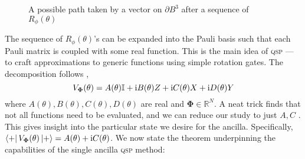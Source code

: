 \documentclass{article}
\begin{document}
\begin{figure}[!ht]
    \centering
    \def\r{1.5}
    \caption{A possible path taken by a vector on $\partial B^3$ after a sequence of $R_\phi(\theta)$}
    \label{fig:phi_graph2}
\end{figure}


The sequence of $R_\phi(\theta)$'s can be expanded into the Pauli basis such that each Pauli matrix is coupled with some real function. This is the main idea of \textsc{qsp} --- to craft approximations to generic functions using simple rotation gates. The decomposition follows \cite{LYC16,LC19},
\begin{equation}
    V_{\boldsymbol{\Phi}}(\theta) = A(\theta)\mathbb{I} + \mathrm{i} B(\theta)Z + \mathrm{i} C(\theta)X + \mathrm{i} D(\theta)Y
\end{equation}
where $A(\theta),B(\theta),C(\theta),D(\theta)$ are real and $\boldsymbol{\Phi}\in\mathbb{R}^N$. A neat trick finds that not all functions need to be evaluated, and we can reduce our study to just $A,C$ \cite{LC19}. This gives insight into the particular state we desire for the ancilla. Specifically, $\bra{+}V_{\boldsymbol{\Phi}}(\theta)\ket{+} = A(\theta) + \mathrm{i} C(\theta)$. We now state the theorem underpinning the capabilities of the single ancilla \textsc{qsp} method:
\end{document}
